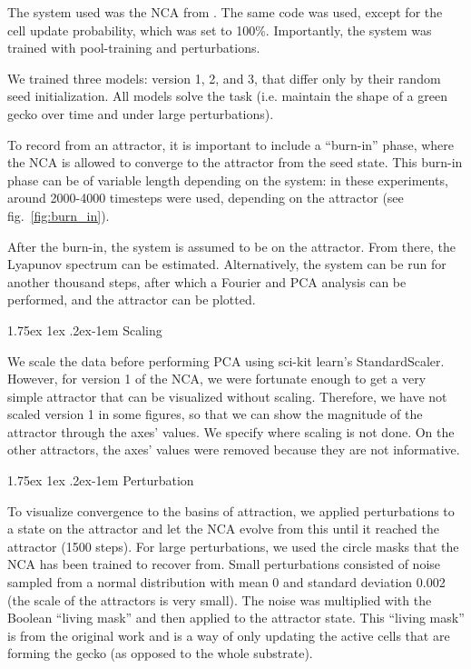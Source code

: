 \documentclass[letterpaper]{article}
\makeatletter
\renewcommand{\paragraph}{%
  \@startsection{paragraph}{4}%
  {\z@}{1.75ex \@plus 1ex \@minus .2ex}{-1em}%
  {\normalfont\normalsize\bfseries}%
}
\makeatother
\begin{document}
The system used was the NCA from \cite{mordvintsev2020growing}. The same code was used, except for the cell update probability, which was set to 100\%. Importantly, the system was trained with pool-training and perturbations. 

We trained three models: version 1, 2, and 3, that differ only by their random seed initialization. All models solve the task (i.e. maintain the shape of a green gecko over time and under large perturbations). 

To record from an attractor, it is important to include a ``burn-in'' phase, where the NCA is allowed to converge to the attractor from the seed state. This burn-in phase can be of variable length depending on the system: in these experiments, around 2000-4000 timesteps were used, depending on the attractor (see fig.\ \ref{fig:burn_in}).

After the burn-in, the system is assumed to be on the attractor. From there, the Lyapunov spectrum can be estimated. Alternatively, the system can be run for another thousand steps, after which a Fourier and PCA analysis can be performed, and the attractor can be plotted. 

\paragraph{Scaling}

We scale the data before performing PCA using sci-kit learn's StandardScaler. However, for version 1 of the NCA, we were fortunate enough to get a very simple attractor that can be visualized without scaling. Therefore, we have not scaled version 1 in some figures, so that we can show the magnitude of the attractor through the axes' values. We specify where scaling is not done. On the other attractors, the axes' values were removed because they are not informative.  

\paragraph{Perturbation}

To visualize convergence to the basins of attraction, we applied perturbations to a state on the attractor and let the NCA evolve from this until it reached the attractor (1500 steps). For large perturbations, we used the circle masks that the NCA has been trained to recover from. Small perturbations consisted of noise sampled from a normal distribution with mean 0 and standard deviation 0.002 (the scale of the attractors is very small). The noise was multiplied with the Boolean ``living mask'' and then applied to the attractor state. This ``living mask'' is from the original work and is a way of only updating the active cells that are forming the gecko (as opposed to the whole substrate).  
\end{document}
